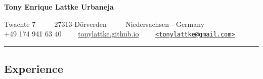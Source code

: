 \documentclass[10pt,letterpaper]{article}
\begin{document}
\date{August, 2014}


\begin{center}
{\LARGE \textbf{Tony Enrique Lattke Urbaneja}}

Twachte 7  \ \ \textbullet
\ \  27313 Dörverden \ \ \textbullet
\ \ Niedersachsen - Germany
\\
+49 174 941 63 40 \ \ \textbullet \ \  \href{http://tonylattke.github.io}{tonylattke.github.io} \ \ \textbullet \ \ \href{mailto:tonylattke@gmail.com}{\nolinkurl{<tonylattke@gmail.com>}}
\end{center}


\hrule
\vspace{-0.4em}
\subsection*{Experience}
\end{document}
